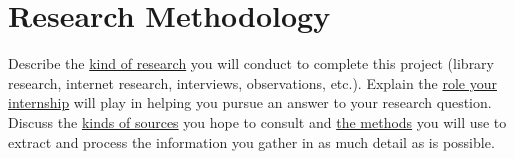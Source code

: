 
\section[Research Methodology]{Research Methodology}

Describe the \underline{kind of research} you will conduct to complete this project (library research, internet research, interviews, observations, etc.). Explain the \underline{role your internship} will play in helping you pursue an answer to your research question. Discuss the \underline{kinds of sources} you hope to consult and \underline{the methods} you will use to extract and process the information you gather in as much detail as is possible.